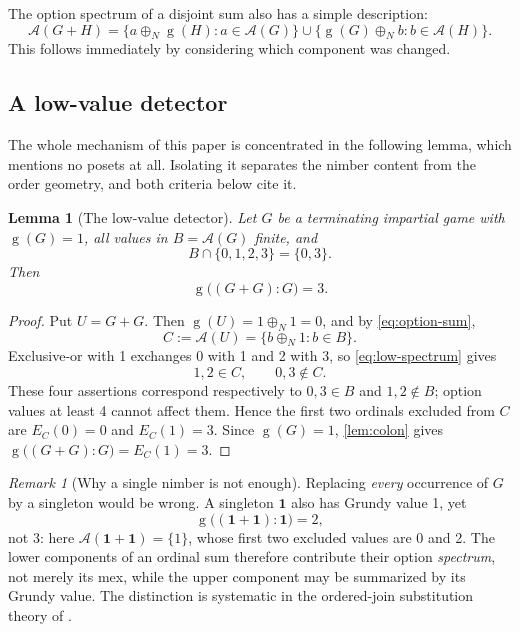 \documentclass[11pt,letterpaper]{article}
\numberwithin{equation}{section}
\newtheorem{lemma}[theorem]{Lemma}
\theoremstyle{definition}
\theoremstyle{remark}
\newtheorem{remark}[theorem]{Remark}
\newcommand{\sg}{\operatorname{g}}
\newcommand{\opt}{\mathcal A}
\newcommand{\nimadd}{\mathbin{\oplus_{\!N}}}
\begin{document}
The option spectrum of a disjoint sum also has a simple description:
\begin{equation}\label{eq:option-sum}
 \opt(G+H)=
 \{a\nimadd\sg(H):a\in\opt(G)\}
 \cup\{\sg(G)\nimadd b:b\in\opt(H)\}.
\end{equation}
This follows immediately by considering which component was changed.

\subsection{A low-value detector}

The whole mechanism of this paper is concentrated in the following
lemma, which mentions no posets at all. Isolating it separates the nimber
content from the order geometry, and both criteria below cite it.

\begin{lemma}[The low-value detector]\label{lem:detector}
Let $G$ be a terminating impartial game with $\sg(G)=1$, all values in
$B=\opt(G)$ finite, and
\begin{equation}\label{eq:low-spectrum}
 B\cap\{0,1,2,3\}=\{0,3\}.
\end{equation}
Then
\begin{equation}\label{eq:detector}
 \sg\bigl((G+G):G\bigr)=3.
\end{equation}
\end{lemma}
\begin{proof}
Put $U=G+G$. Then $\sg(U)=1\nimadd1=0$, and by \cref{eq:option-sum},
\[
 C:=\opt(U)=\{b\nimadd1:b\in B\}.
\]
Exclusive-or with 1 exchanges 0 with 1 and 2 with 3, so
\cref{eq:low-spectrum} gives
\[
 1,2\in C,\qquad 0,3\notin C.
\]
These four assertions correspond respectively to $0,3\in B$ and
$1,2\notin B$; option values at least 4 cannot affect them. Hence the
first two ordinals excluded from $C$ are $E_C(0)=0$ and $E_C(1)=3$.
Since $\sg(G)=1$, \cref{lem:colon} gives
$\sg\bigl((G+G):G\bigr)=E_C(1)=3$.
\end{proof}

\begin{remark}[Why a single nimber is not enough]\label{rem:substitution}
Replacing \emph{every} occurrence of $G$ by a singleton would be wrong.
A singleton $\mathbf1$ also has Grundy value 1, yet
\[
 \sg\bigl((\mathbf1+\mathbf1):\mathbf1\bigr)=2,
\]
not 3: here $\opt(\mathbf1+\mathbf1)=\{1\}$, whose first two excluded
values are 0 and 2. The lower components of an ordinal sum therefore
contribute their option \emph{spectrum}, not merely its mex, while the
upper component may be summarized by its Grundy value. The distinction is
systematic in the ordered-join substitution theory of
\cite[Section 4]{GT21}.
\end{remark}
\end{document}
